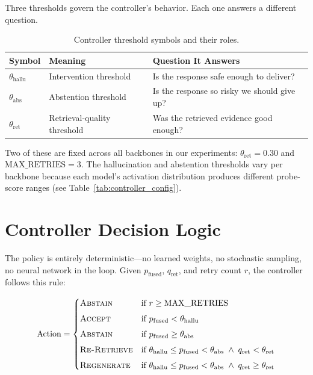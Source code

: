 Three thresholds govern the controller's behavior. Each one answers a different question.

\begin{table}[!htb]
\centering
\caption{Controller threshold symbols and their roles.}
\label{tab:threshold_symbols}
\begin{tabular}{@{}lll@{}}
\toprule
\textbf{Symbol} & \textbf{Meaning} & \textbf{Question It Answers} \\
\midrule
$\theta_{\text{hallu}}$ & Intervention threshold & Is the response safe enough to deliver? \\
$\theta_{\text{abs}}$   & Abstention threshold  & Is the response so risky we should give up? \\
$\theta_{\text{ret}}$   & Retrieval-quality threshold & Was the retrieved evidence good enough? \\
\bottomrule
\end{tabular}
\end{table}

Two of these are fixed across all backbones in our experiments: $\theta_{\text{ret}} = 0.30$ and $\text{MAX\_RETRIES} = 3$. The hallucination and abstention thresholds vary per backbone because each model's activation distribution produces different probe-score ranges (see Table~\ref{tab:controller_config}).

\section{Controller Decision Logic}
\label{sec:controller_logic}

The policy is entirely deterministic—no learned weights, no stochastic sampling, no neural network in the loop. Given $p_{\text{fused}}$, $q_{\text{ret}}$, and retry count $r$, the controller follows this rule:

\begin{equation}
\text{Action} = 
\begin{cases}
    \textsc{Abstain}      & \text{if } r \geq \text{MAX\_RETRIES} \\[4pt]
    \textsc{Accept}       & \text{if } p_{\text{fused}} < \theta_{\text{hallu}} \\[4pt]
    \textsc{Abstain}      & \text{if } p_{\text{fused}} \geq \theta_{\text{abs}} \\[4pt]
    \textsc{Re-Retrieve}  & \text{if } \theta_{\text{hallu}} \leq p_{\text{fused}} < \theta_{\text{abs}} \;\wedge\; q_{\text{ret}} < \theta_{\text{ret}} \\[4pt]
    \textsc{Regenerate}   & \text{if } \theta_{\text{hallu}} \leq p_{\text{fused}} < \theta_{\text{abs}} \;\wedge\; q_{\text{ret}} \geq \theta_{\text{ret}}
\end{cases}
\label{eq:controller_rule}
\end{equation}

